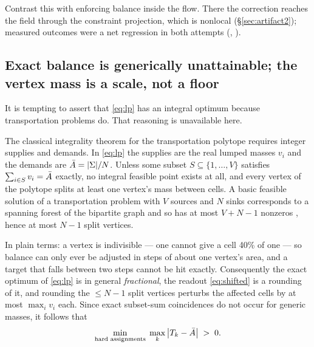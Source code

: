 \documentclass[11pt,a4paper]{article}
\begin{document}
Contrast this with enforcing balance inside the flow. There the correction reaches
the field through the constraint projection, which is nonlocal
(\S\ref{sec:artifact2}); measured outcomes were a net regression in both attempts
(,
).

\subsection{Exact balance is generically unattainable; the vertex mass is a scale, not a floor}

It is tempting to assert that \eqref{eq:lp} has an integral optimum because
transportation problems do. That reasoning is unavailable here.

\begin{prop}
\label{prop:integrality}
The classical integrality theorem for the transportation polytope
\cite[Ch.~9]{ahuja1993network} requires integer supplies and demands. In \eqref{eq:lp} the supplies are the real lumped
masses $v_i$ and the demands are $\bar{A} = |\Sigma|/N$. Unless some subset
$S \subseteq \{1,\dots,V\}$ satisfies $\sum_{i \in S} v_i = \bar{A}$ exactly, no
integral feasible point exists at all, and every vertex of the polytope splits at
least one vertex's mass between cells. A basic feasible solution of a
transportation problem with $V$ sources and $N$ sinks corresponds to a spanning
forest of the bipartite graph and so has at most $V + N - 1$ nonzeros
\cite[Ch.~11]{ahuja1993network}, hence at most $N-1$ split vertices.
\end{prop}

In plain terms: a vertex is indivisible --- one cannot give a cell 40\% of one ---
so balance can only ever be adjusted in steps of about one vertex's area, and a
target that falls between two steps cannot be hit exactly. Consequently the exact
optimum of \eqref{eq:lp} is in general \emph{fractional}, the readout
\eqref{eq:shifted} is a rounding of it, and rounding the $\le N-1$
split vertices perturbs the affected cells by at most $\max_i v_i$ each. Since
exact subset-sum coincidences do not occur for generic masses, it follows that
\begin{equation}
  \min_{\text{hard assignments}} \; \max_k \big| T_k - \bar{A} \big| \;>\; 0 .
  \label{eq:granularity}
\end{equation}
\end{document}
